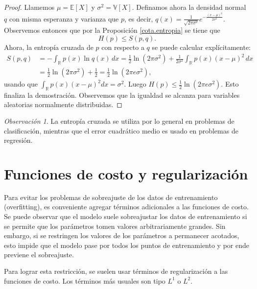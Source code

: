 \documentclass[12pt, a4paper]{amsbook}
\newcommand{\R}{{\mathbb R}}
\newcommand{\E}{{\mathbb E}}
\newcommand{\V}{{\mathbb V}}
\theoremstyle{remark}
\newtheorem{obs}[teo]{Observaci\'on}
\theoremstyle{definition}
\numberwithin{section}{chapter}
\numberwithin{subsection}{section}
\numberwithin{equation}{section}
\numberwithin{figure}{chapter}
\begin{document}
\begin{proof}
Llamemos $\mu = \E[X]$ y $\sigma^2 = \V[X]$. Definamos ahora la densidad normal $q$ con misma esperanza y varianza que $p$, es decir, $q(x) = \frac{1}{\sqrt{2\pi\sigma^2}} e^{-\frac{(x-\mu)^2}{2\sigma^2}}$. Observemos entonces que por la Proposición \ref{cota.entropia} se tiene que
$$
H(p)\le S(p, q).
$$
Ahora, la entropía cruzada de $p$ con respecto a $q$ se puede calcular explícitamente:
\begin{align*}
S(p, q) &= - \int_\R p(x)\ln q(x)\, dx = \frac12 \ln(2\pi\sigma^2) + \frac{1}{2\sigma^2}\int_\R p(x) (x-\mu)^2\, dx\\
&= \frac12 \ln(2\pi\sigma^2) + \frac12 = \frac12 \ln(2\pi e\sigma^2),
\end{align*}
usando que $\int_\R p(x)(x-\mu)^2dx=\sigma^2$. Luego $H(p)\le\frac12\ln(2\pi e\sigma^2)$.
Esto finaliza la demostración. Observemos que la igualdad se alcanza para variables aleatorias normalmente distribuidas.
\end{proof}

\begin{obs}
La entropía cruzada se utiliza por lo general en problemas de clasificación, mientras que el error cuadrático medio es usado en problemas de regresión.
\end{obs}

\section{Funciones de costo y regularización}\label{sec.c3.3}

Para evitar los problemas de sobreajuste de los datos de entrenamiento (overfitting), es conveniente agregar términos adicionales a las funciones de costo. Se puede observar que el modelo suele sobreajustar los datos de entrenamiento si se permite que los parámetros tomen valores arbitrariamente grandes. Sin embargo, si se restringen los valores de los parámetros a permanecer acotados, esto impide que el modelo pase por todos los puntos de entrenamiento y por ende previene el sobreajuste. 

Para lograr esta restricción, se suelen usar términos de regularización a las funciones de costo. Los términos más usuales son tipo $L^1$ o $L^2$.
\end{document}
